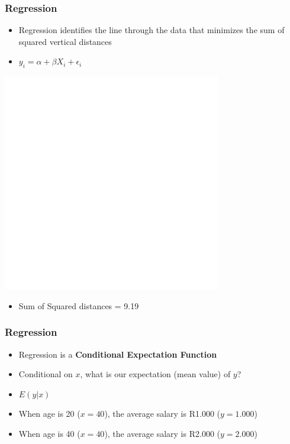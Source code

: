 \documentclass[xcolor=x11names,compress]{beamer}\usepackage[]{graphicx}\usepackage[]{color}
\makeatletter
\def\maxwidth{ %
  \ifdim\Gin@nat@width>\linewidth
    \linewidth
  \else
    \Gin@nat@width
  \fi
}
\newenvironment{knitrout}{}{} %
\renewcommand{\(}{\begin{columns}}
\renewcommand{\)}{\end{columns}}
\newcommand{\<}[1]{\begin{column}{#1}}
\renewcommand{\>}{\end{column}}
\makeatother
\begin{document}
\begin{frame}
\frametitle{Regression}
\begin{itemize}
\item Regression identifies the line through the data that minimizes the sum of squared vertical distances 
\item $y_i = \alpha + \beta X_i + \epsilon_i$
\end{itemize}
\begin{multicols}{2}
\begin{knitrout}
\color{fgcolor}
\includegraphics[width=\maxwidth]{figure/graph_reg5-1} 

\end{knitrout}
\columnbreak
\begin{itemize}
\item Sum of Squared distances = 9.19
\end{itemize}
\end{multicols}
\end{frame}



\begin{frame}
\frametitle{Regression}
\begin{itemize}
\item Regression is a \textbf{Conditional Expectation Function}
\pause
\item Conditional on $x$, what is our expectation (mean value) of $y$?
\pause
\item $E(y|x)$
\pause
\item When age is 20 ($x=40$), the average salary is R1.000 ($y=1.000$)
\item When age is 40 ($x=40$), the average salary is R2.000 ($y=2.000$)
\end{itemize}
\end{frame}
\end{document}
